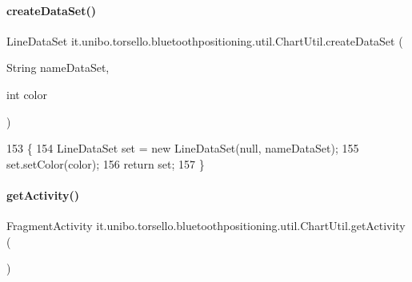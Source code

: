 \paragraph{\texorpdfstring{create\+Data\+Set()}{createDataSet()}\hspace{0.1cm}{\footnotesize\ttfamily [2/2]}}
{\footnotesize\ttfamily Line\+Data\+Set it.\+unibo.\+torsello.\+bluetoothpositioning.\+util.\+Chart\+Util.\+create\+Data\+Set (\begin{DoxyParamCaption}\item[{String}]{name\+Data\+Set,  }\item[{int}]{color }\end{DoxyParamCaption})\hspace{0.3cm}{\ttfamily [private]}}


\begin{DoxyCode}
153                                                                      \{
154         LineDataSet \textcolor{keyword}{set} = \textcolor{keyword}{new} LineDataSet(null, nameDataSet);
155         \textcolor{keyword}{set}.setColor(color);
156         \textcolor{keywordflow}{return} \textcolor{keyword}{set};
157     \}
\end{DoxyCode}
\hypertarget{classit_1_1unibo_1_1torsello_1_1bluetoothpositioning_1_1util_1_1ChartUtil_a59150a6d20b6d0ad2fcf8c1ba858d355_a59150a6d20b6d0ad2fcf8c1ba858d355}{}\label{classit_1_1unibo_1_1torsello_1_1bluetoothpositioning_1_1util_1_1ChartUtil_a59150a6d20b6d0ad2fcf8c1ba858d355_a59150a6d20b6d0ad2fcf8c1ba858d355} 
\paragraph{\texorpdfstring{get\+Activity()}{getActivity()}}
{\footnotesize\ttfamily Fragment\+Activity it.\+unibo.\+torsello.\+bluetoothpositioning.\+util.\+Chart\+Util.\+get\+Activity (\begin{DoxyParamCaption}{ }\end{DoxyParamCaption})}


